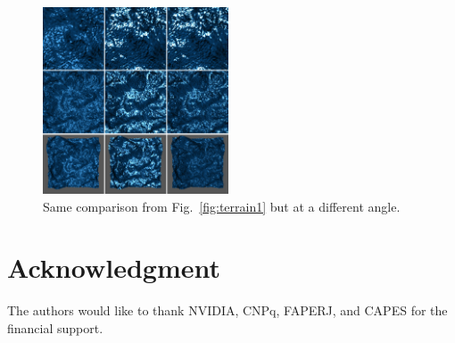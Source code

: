 \documentclass[10pt, conference]{IEEEtran}
\begin{document}
\begin{figure}[!t]
	\includegraphics[width=0.49\textwidth]{figs/terrain2.png}
	\caption{Same comparison from Fig.~\ref{fig:terrain1} but at a different angle.}
	\label{fig:terrain2}
\end{figure}


\iffinal
\section*{Acknowledgment}
%
The authors would like to thank NVIDIA, CNPq, FAPERJ, and CAPES for the financial support.
\fi



\end{document}
